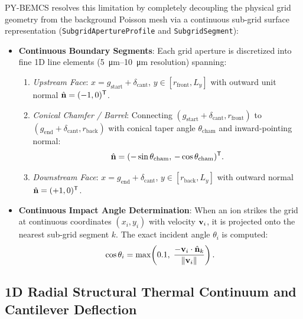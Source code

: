 \documentclass[11pt,a4paper]{article}
\newcommand{\PYBEMCS}{PY-BEMCS}
\begin{document}
\PYBEMCS{} resolves this limitation by completely decoupling the physical grid geometry from the background Poisson mesh via a continuous sub-grid surface representation (\texttt{SubgridApertureProfile} and \texttt{SubgridSegment}):
\begin{itemize}[nosep]
    \item \textbf{Continuous Boundary Segments}: Each grid aperture is discretized into fine 1D line elements (\SI{5}{\micro\meter}--\SI{10}{\micro\meter} resolution) spanning:
    \begin{enumerate}[label=(\roman*),nosep]
        \item \emph{Upstream Face}: $x = g_{\mathrm{start}} + \delta_{\mathrm{cant}}$, $y \in [r_{\mathrm{front}}, L_y]$ with outward unit normal $\hat{\vb{n}} = (-1, 0)^{\mathsf{T}}$.
        \item \emph{Conical Chamfer / Barrel}: Connecting $(g_{\mathrm{start}} + \delta_{\mathrm{cant}}, r_{\mathrm{front}})$ to $(g_{\mathrm{end}} + \delta_{\mathrm{cant}}, r_{\mathrm{back}})$ with conical taper angle $\theta_{\mathrm{cham}}$ and inward-pointing normal:
        \begin{equation}
            \hat{\vb{n}} = (-\sin\theta_{\mathrm{cham}}, \, -\cos\theta_{\mathrm{cham}})^{\mathsf{T}}.
        \end{equation}
        \item \emph{Downstream Face}: $x = g_{\mathrm{end}} + \delta_{\mathrm{cant}}$, $y \in [r_{\mathrm{back}}, L_y]$ with outward normal $\hat{\vb{n}} = (+1, 0)^{\mathsf{T}}$.
    \end{enumerate}
    \item \textbf{Continuous Impact Angle Determination}: When an ion strikes the grid at continuous coordinates $(x_i, y_i)$ with velocity $\vb{v}_i$, it is projected onto the nearest sub-grid segment $k$. The exact incident angle $\theta_i$ is computed:
    \begin{equation}
        \cos\theta_i = \max\!\left(0.1, \; \frac{-\vb{v}_i \cdot \hat{\vb{n}}_k}{\|\vb{v}_i\|}\right).
    \end{equation}
\end{itemize}

\subsection{1D Radial Structural Thermal Continuum and Cantilever Deflection}
\label{sec:subgrid_thermal}
\end{document}
